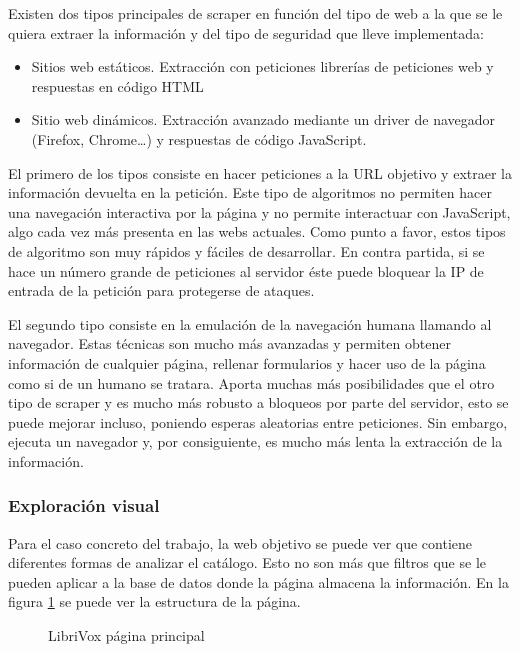 Existen dos tipos principales de \gls{scraper} en función del tipo de web a la que se le quiera extraer la información y del tipo de seguridad que lleve implementada:
\begin{itemize}
	\item Sitios web estáticos. Extracción con peticiones librerías de peticiones web y respuestas en código \gls{HTML}
	\item Sitio web dinámicos. Extracción avanzado mediante un driver de navegador (Firefox, Chrome\dots) y respuestas de código JavaScript.
\end{itemize}
El primero de los tipos consiste en hacer peticiones a la \gls{URL} objetivo y extraer la información devuelta en la petición. Este tipo de algoritmos no permiten hacer una navegación interactiva por la página y no permite interactuar con JavaScript, algo cada vez más presenta en las webs actuales. Como punto a favor, estos tipos de algoritmo son muy rápidos y fáciles de desarrollar. En contra partida, si se hace un número grande de peticiones al servidor éste puede bloquear la IP de entrada de la petición para protegerse de ataques.

El segundo tipo consiste en la emulación de la navegación humana llamando al navegador. Estas técnicas son mucho más avanzadas y permiten obtener información de cualquier página, rellenar formularios y hacer uso de la página como si de un humano se tratara. Aporta muchas más posibilidades que el otro tipo de \gls{scraper} y es mucho más robusto a bloqueos por parte del servidor, esto se puede mejorar incluso, poniendo esperas aleatorias entre peticiones. Sin embargo, ejecuta un navegador y, por consiguiente, es mucho más lenta la extracción de la información.

\subsubsection{Exploración visual}
Para el caso concreto del trabajo, la web objetivo se puede ver que contiene diferentes formas de analizar el catálogo. Esto no son más que filtros que se le pueden aplicar a la base de datos donde la página almacena la información. En la figura \ref{fig: librivox_cover} se puede ver la estructura de la página.
\begin{figure}[ht!]
	\centering
	\caption{LibriVox página principal}
	\label{fig: librivox_cover}
\end{figure}
